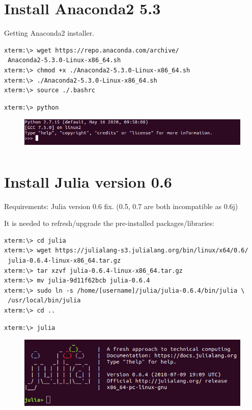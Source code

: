 \documentclass[openany,11pt]{report}%
\begin{document}
\section{Install Anaconda2 5.3}

Getting Anaconda2 installer.

\begin{lstlisting}[style=DOS]
xterm:\> wget https://repo.anaconda.com/archive/
 Anaconda2-5.3.0-Linux-x86_64.sh
xterm:\> chmod +x ./Anaconda2-5.3.0-Linux-x86_64.sh
xterm:\> ./Anaconda2-5.3.0-Linux-x86_64.sh
xterm:\> source ./.bashrc
\end{lstlisting}


\begin{lstlisting}[style=DOS]
xterm:\> python
\end{lstlisting}

\begin{figure}[h]
    \centering
    \includegraphics[width=\textwidth]{img/python.png}
    \label{fig: python versin}
\end{figure}

\section{Install Julia version 0.6}
Requirements: Julia version 0.6 fix.  (0.5, 0.7 are both incompatible as 0.6j)

It is needed to refresh/upgrade the pre-installed packages/libraries:
\begin{lstlisting}[style=DOS]
xterm:\> cd julia 
xterm:\> wget https://julialang-s3.julialang.org/bin/linux/x64/0.6/
 julia-0.6.4-linux-x86_64.tar.gz
xterm:\> tar xzvf julia-0.6.4-linux-x86_64.tar.gz
xterm:\> mv julia-9d11f62bcb julia-0.6.4
xterm:\> sudo ln -s /home/[username]/julia/julia-0.6.4/bin/julia \
 /usr/local/bin/julia
xterm:\> cd ..
\end{lstlisting}


\begin{lstlisting}[style=DOS]
xterm:\> julia
\end{lstlisting}

\begin{figure}[h]
    \centering
    \includegraphics[width=\textwidth]{img/julia.png}
    \label{fig: 2DMOT2015}
\end{figure}
\end{document}
